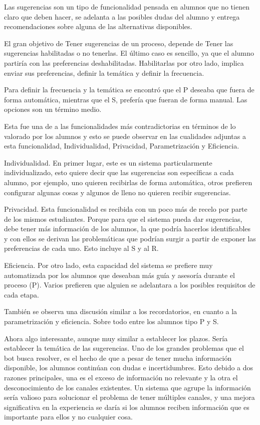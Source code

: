         \par Las sugerencias son un tipo de funcionalidad pensada en alumnos que no tienen claro que deben hacer, se adelanta a las posibles dudas del alumno y entrega recomendaciones sobre alguna de las alternativas disponibles. 
        \par El gran objetivo de Tener sugerencias de un proceso, depende de Tener las sugerencias habilitadas o no tenerlas. El último caso es sencillo, ya que el alumno partiría con las preferencias deshabilitadas. Habilitarlas por otro lado, implica enviar sus preferencias, definir la temática y definir la frecuencia.
        \par Para definir la frecuencia y la temática se encontró que el \acrshort{P} deseaba que fuera de forma automática, mientras que el \acrshort{S}, prefería que fueran de forma manual. Las opciones son un término medio.
        \par Esta fue una de a las funcionalidades más contradictorias en términos de lo valorado por los alumnos y esto se puede observar en las cualidades adjuntas a esta funcionalidad, Individualidad, Privacidad, Parametrización y Eficiencia.
        \par Individualidad. En primer lugar, este es un sistema particularmente individualizado, esto quiere decir que las sugerencias son específicas a cada alumno, por ejemplo, uno quieren recibirlas de forma automática, otros prefieren configurar algunas cosas y algunos de lleno no quieren recibir sugerencias.
        \par Privacidad. Esta funcionalidad es recibida con un poco más de recelo por parte de los mismos estudiantes. Porque para que el sistema pueda dar sugerencias, debe tener más información de los alumnos, la que podría hacerlos identificables y con ellos se derivan las problemáticas que podrían surgir a partir de exponer las preferencias de cada uno. Esto incluye al \acrlong{S} y al \acrlong{R}.
        \par Eficiencia. Por otro lado, esta capacidad del sistema se prefiere muy automatizada por los alumnos que deseaban más guía y asesoría durante el proceso (\acrshort{P}). Varios prefieren que alguien se adelantara a los posibles requisitos de cada etapa.
        \par También se observa una discusión similar a los recordatorios, en cuanto a la parametrización y eficiencia. Sobre todo entre los alumnos tipo \acrshort{P} y \acrshort{S}.
        \par Ahora algo interesante, aunque muy similar a establecer los plazos. Sería establecer la temática de las sugerencias. Uno de los grandes problemas que el bot busca resolver, es el hecho de que a pesar de tener mucha información disponible, los alumnos continúan con dudas e incertidumbres. Esto debido a dos razones principales, una es el exceso de información no relevante y la otra el desconocimiento de los canales existentes. Un sistema que agrupe la información sería valioso para solucionar el problema de tener múltiples canales, y una mejora significativa en la experiencia se daría si los alumnos reciben información que es importante para ellos y no cualquier cosa.
